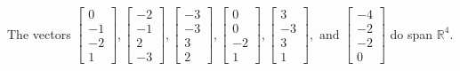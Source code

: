 \begin{exercise}
\begin{exerciseStatement}
  \end{exerciseStatement}
  \begin{exerciseAnswer}
   The vectors \(\left[\begin{array}{r}
0 \\
-1 \\
-2 \\
1
\end{array}\right] , \left[\begin{array}{r}
-2 \\
-1 \\
2 \\
-3
\end{array}\right] , \left[\begin{array}{r}
-3 \\
-3 \\
3 \\
2
\end{array}\right] , \left[\begin{array}{r}
0 \\
0 \\
-2 \\
1
\end{array}\right] , \left[\begin{array}{r}
3 \\
-3 \\
3 \\
1
\end{array}\right] , \text{ and } \left[\begin{array}{r}
-4 \\
-2 \\
-2 \\
0
\end{array}\right]\) 
  	 do  
	span \(\mathbb{R}^4\).
  


  \end{exerciseAnswer}
\end{exercise}